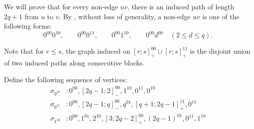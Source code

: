 \documentclass[11pt]{article}
\theoremstyle{definition}
\theoremstyle{remark}
\begin{document}
We will prove that for every non-edge $uv$, there is an induced path of length $2q+1$ from $u$ to $v$. 
By , without loss of generality, a non-edge $uv$ is one of the following forms: 
\[
  0^{00}0^{10},\qquad
  0^{00}0^{11},\qquad
  0^{00}1^{10},\qquad
  0^{00}d^{00}\quad(2\le d\le q).
\]

Note that for $r\le s$, the graph induced on
$[r;s]_{+}^{00}\cup[r;s]_{+}^{11}$
is the disjoint union of two induced paths along consecutive blocks.

Define the following sequence of vertices: 
\begin{align*}
\sigma_{0^{10}}
  &:
  0^{00},[2q-1;2]_{-}^{00},1^{10},0^{11},0^{10} \\
\sigma_{0^{11}}
  &:
  0^{00},[2q-1;q]_{-}^{00},q^{01},
  [q+1;2q-1]_{+}^{11},0^{11} \\
\sigma_{1^{10}}
  &:
  0^{00},1^{01},2^{10},[3;2q-2]_{+}^{00},
  (2q-1)^{01},0^{11},1^{10}
\end{align*}



\end{document}
